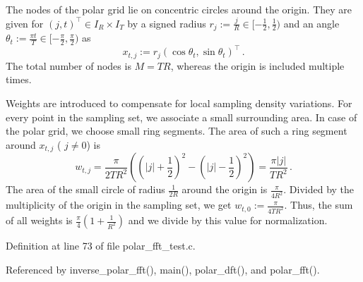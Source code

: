 The nodes of the polar grid lie on concentric circles around the origin. They are given for $(j,t)^{\top}\in I_R\times I_T$ by a signed radius $r_j := \frac{j}{R} \in [-\frac{1}{2},\frac{1}{2})$ and an angle $\theta_t := \frac{\pi t}{T} \in [-\frac{\pi}{2},\frac{\pi}{2})$ as \[ x_{t,j} := r_j\left(\cos\theta_t, \sin\theta_t\right)^{\top}\,. \] The total number of nodes is $M=TR$, whereas the origin is included multiple times.

Weights are introduced to compensate for local sampling density variations. For every point in the sampling set, we associate a small surrounding area. In case of the polar grid, we choose small ring segments. The area of such a ring segment around $x_{t,j}$ ( $j \ne 0$) is \[ w_{t,j} = \frac{\pi}{2TR^2}\left(\left(|j|+\frac{1}{2}\right)^2- \left(|j|-\frac{1}{2}\right)^2\right) = \frac{\pi |j| }{TR^2}\, . \] The area of the small circle of radius $\frac{1}{2R}$ around the origin is $\frac{\pi}{4R^2}$. Divided by the multiplicity of the origin in the sampling set, we get $w_{t,0} := \frac{\pi}{4TR^2}$. Thus, the sum of all weights is $\frac{\pi}{4}(1+\frac{1}{R^2})$ and we divide by this value for normalization. 

Definition at line 73 of file polar\-\_\-fft\-\_\-test.\-c.



Referenced by inverse\-\_\-polar\-\_\-fft(), main(), polar\-\_\-dft(), and polar\-\_\-fft().

